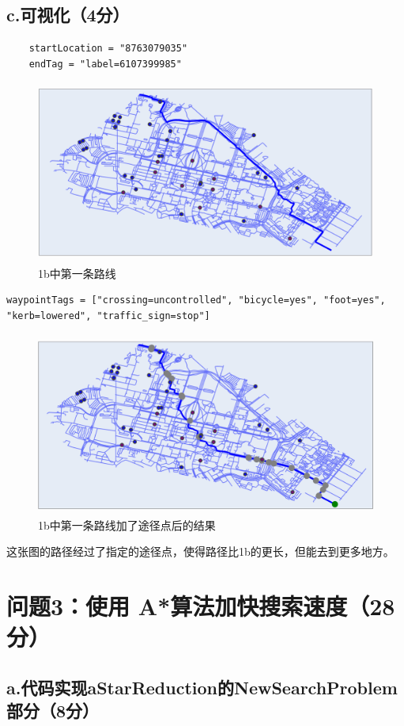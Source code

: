 \documentclass{article}
\begin{document}
\subsection*{c.可视化（4分）}
\begin{lstlisting}
    startLocation = "8763079035"
    endTag = "label=6107399985"
    \end{lstlisting}
\begin{figure}[H]
    \centering 
    \includegraphics[height=6cm,width=14cm]{1.png}
    \caption{1b中第一条路线}
    \end{figure}
\begin{lstlisting}
waypointTags = ["crossing=uncontrolled", "bicycle=yes", "foot=yes", "kerb=lowered", "traffic_sign=stop"]
\end{lstlisting}
\begin{figure}[H]
	\centering 
	\includegraphics[height=6cm,width=14cm]{2.png}
    \caption{1b中第一条路线加了途径点后的结果}
	\end{figure}
    这张图的路径经过了指定的途径点，使得路径比1b的更长，但能去到更多地方。
\section*{问题3：使用 A*算法加快搜索速度（28分）}
\subsection*{a.代码实现aStarReduction的NewSearchProblem部分（8分）}
\end{document}
